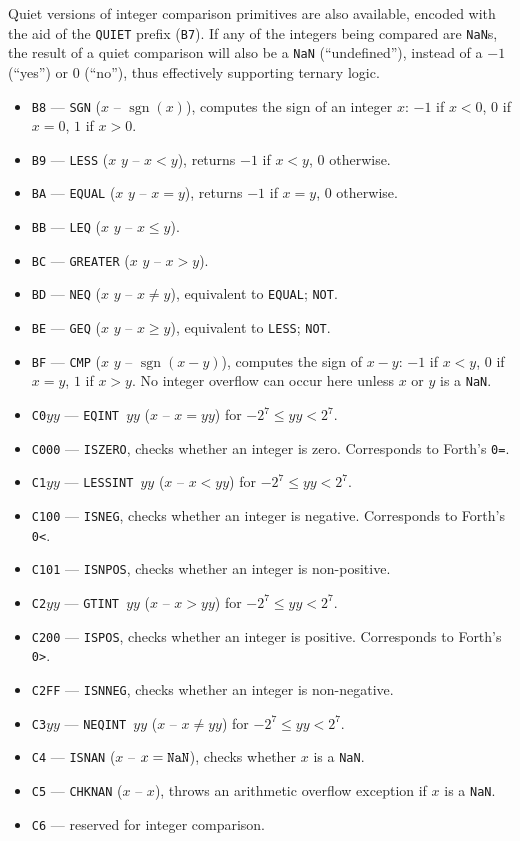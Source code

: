 \documentclass[12pt,oneside]{article}
\def\sgn{\operatorname{sgn}}
\begin{document}
Quiet versions of integer comparison primitives are also available, encoded with the aid of the {\tt QUIET} prefix ({\tt B7}). If any of the integers being compared are {\tt NaN}s, the result of a quiet comparison will also be a {\tt NaN} (``undefined''), instead of a $-1$ (``yes'') or $0$ (``no''), thus effectively supporting ternary logic.

\begin{itemize}
\item {\tt B8} --- {\tt SGN} ($x$ -- $\sgn(x)$), computes the sign of an integer $x$: $-1$ if $x<0$, $0$ if $x=0$, $1$ if $x>0$.
\item {\tt B9} --- {\tt LESS} ($x$ $y$ -- $x<y$), returns $-1$ if $x<y$, $0$ otherwise.
\item {\tt BA} --- {\tt EQUAL} ($x$ $y$ -- $x=y$), returns $-1$ if $x=y$, $0$ otherwise.
\item {\tt BB} --- {\tt LEQ} ($x$ $y$ -- $x\leq y$).
\item {\tt BC} --- {\tt GREATER} ($x$ $y$ -- $x>y$).
\item {\tt BD} --- {\tt NEQ} ($x$ $y$ -- $x\neq y$), equivalent to {\tt EQUAL}; {\tt NOT}.
\item {\tt BE} --- {\tt GEQ} ($x$ $y$ -- $x\geq y$), equivalent to {\tt LESS}; {\tt NOT}.
\item {\tt BF} --- {\tt CMP} ($x$ $y$ -- $\sgn(x-y)$), computes the sign of $x-y$: $-1$ if $x<y$, $0$ if $x=y$, $1$ if $x>y$. No integer overflow can occur here unless $x$ or $y$ is a {\tt NaN}.
\item {\tt C0$yy$} --- {\tt EQINT $yy$} ($x$ -- $x=yy$) for $-2^7\leq yy<2^7$.
\item {\tt C000} --- {\tt ISZERO}, checks whether an integer is zero. Corresponds to Forth's {\tt 0=}.
\item {\tt C1$yy$} --- {\tt LESSINT $yy$} ($x$ -- $x<yy$) for $-2^7\leq yy<2^7$.
\item {\tt C100} --- {\tt ISNEG}, checks whether an integer is negative. Corresponds to Forth's {\tt 0<}.
\item {\tt C101} --- {\tt ISNPOS}, checks whether an integer is non-positive.
\item {\tt C2$yy$} --- {\tt GTINT $yy$} ($x$ -- $x>yy$) for $-2^7\leq yy<2^7$.
\item {\tt C200} --- {\tt ISPOS}, checks whether an integer is positive. Corresponds to Forth's {\tt 0>}.
\item {\tt C2FF} --- {\tt ISNNEG}, checks whether an integer is non-negative.
\item {\tt C3$yy$} --- {\tt NEQINT $yy$} ($x$ -- $x\neq yy$) for $-2^7\leq yy<2^7$.
\item {\tt C4} --- {\tt ISNAN} ($x$ -- $x={\tt NaN}$), checks whether $x$ is a {\tt NaN}.
\item {\tt C5} --- {\tt CHKNAN} ($x$ -- $x$), throws an arithmetic overflow exception if $x$ is a {\tt NaN}.
\item {\tt C6} --- reserved for integer comparison.
\end{itemize}
\end{document}
